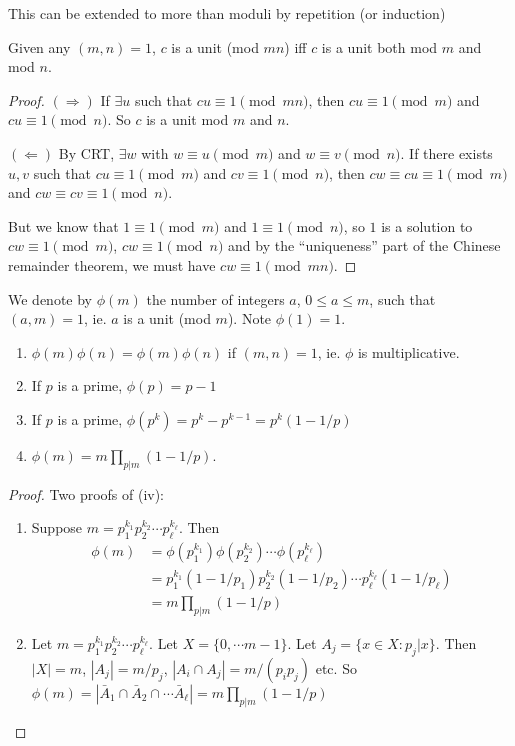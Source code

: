 \documentclass[a4paper]{article}
\begin{document}
  \note This can be extended to more than moduli by repetition (or induction)

  \begin{prop}
    Given any $(m,n) = 1$, $c$ is a unit (mod $mn$) iff $c$ is a unit both mod $m$ and mod $n$.
  \end{prop}

  \begin{proof}
    $(\Rightarrow)$ If $\exists u$ such that $cu \equiv 1 \pmod {mn}$, then $cu \equiv 1\pmod m$ and $cu\equiv 1\pmod n$. So $c$ is a unit mod $m$ and $n$.

    $(\Leftarrow)$ By CRT, $\exists w$ with $w\equiv u \pmod m$  and $w\equiv v\pmod n$. If there exists $u, v$ such that $cu\equiv 1\pmod m$ and $cv \equiv 1\pmod n$, then $cw\equiv cu\equiv 1\pmod m$ and $cw\equiv cv\equiv 1\pmod n$.

    But we know that $1\equiv 1\pmod m$ and $1\equiv 1\pmod n$, so $1$ is a solution to $cw \equiv 1\pmod m$, $cw\equiv 1\pmod n$ and by the ``uniqueness'' part of the Chinese remainder theorem, we must have $cw\equiv 1\pmod {mn}$.
  \end{proof}

  \begin{defi}
    We denote by $\phi(m)$ the number of integers $a$, $0\leq a\leq m$, such that $(a, m) = 1$, ie. $a$ is a unit (mod $m$). Note $\phi(1) = 1$.
  \end{defi}

  \begin{prop}\leavevmode
    \begin{enumerate}
      \item $\phi(m)\phi(n) = \phi(m)\phi(n)$ if $(m, n) = 1$, ie. $\phi$ is multiplicative.
      \item If $p$ is a prime, $\phi(p) = p - 1$
      \item If $p$ is a prime, $\phi(p^k) = p^k - p^{k - 1} = p^k(1 - 1/p)$
      \item $\phi(m) = m\prod_{p | m}(1 - 1/p)$.
    \end{enumerate}
  \end{prop}

  \begin{proof}
    Two proofs of (iv):
    \begin{enumerate}
      \item Suppose $m = p_1^{k_1}p_2^{k_2}\cdots p_\ell^{k_\ell}$. Then 
        \begin{align*}
          \phi(m) &= \phi(p_1^{k_1})\phi(p_2^{k_2})\cdots \phi(p_\ell^{k_\ell})\\
          &= p_1^{k_1}(1-1/p_1)p_2^{k_2}(1 - 1/p_2)\cdots p_\ell^{k_\ell}(1 - 1/p_\ell)\\
          &= m\prod_{p | m}(1 - 1/p)
        \end{align*}
      \item Let $m = p_1^{k_1}p_2^{k_2}\cdots p_\ell^{k_\ell}$. Let $X = \{0, \cdots m - 1\}$. Let $A_j = \{x\in X: p_j|x\}$. Then $|X| = m$, $|A_j| = m/p_j$, $|A_i\cap A_j| = m/(p_ip_j)$ etc. So $\phi(m) = |\bar A_1\cap \bar A_2\cap \cdots \bar A_\ell| = m\prod_{p | m}(1 - 1/p)$
    \end{enumerate}
  \end{proof}
\end{document}
